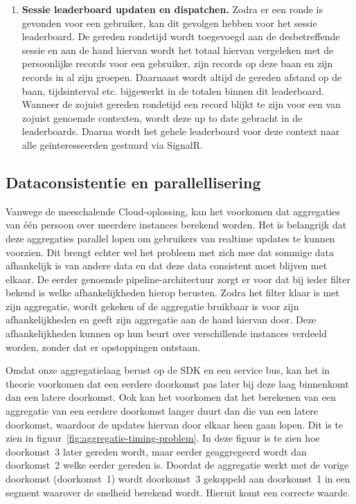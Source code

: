 \begin{enumerate}
\item \textbf{Sessie leaderboard updaten en dispatchen.}
Zodra er een ronde is gevonden voor een gebruiker, kan dit gevolgen hebben voor het sessie leaderboard. De gereden rondetijd wordt toegevoegd aan de desbetreffende sessie en aan de hand hiervan wordt het totaal hiervan vergeleken met de persoonlijke records voor een gebruiker, zijn records op deze baan en zijn records in al zijn groepen. Daarnaast wordt altijd de gereden afstand op de baan, tijdsinterval etc. bijgewerkt in de totalen binnen dit leaderboard. Wanneer de zojuist gereden rondetijd een record blijkt te zijn voor een van zojuist genoemde contexten, wordt deze up to date gebracht in de leaderboards. Daarna wordt het gehele leaderboard voor deze context naar alle geïnteresseerden gestuurd via SignalR.

\end{enumerate}

\subsection{Dataconsistentie en parallellisering}
Vanwege de meeschalende Cloud-oplossing, kan het voorkomen dat aggregaties van één persoon over meerdere instances berekend worden. Het is belangrijk dat deze aggregaties parallel lopen om gebruikers van realtime updates te kunnen voorzien. Dit brengt echter wel het probleem met zich mee dat sommige data afhankelijk is van andere data en dat deze data consistent moet blijven met elkaar. De eerder genoemde pipeline-architectuur zorgt er voor dat bij ieder filter bekend is welke afhankelijkheden hierop berusten. Zodra het filter klaar is met zijn aggregatie, wordt gekeken of de aggregatie bruikbaar is voor zijn afhankelijkheden en geeft zijn aggregatie aan de hand hiervan door. Deze afhankelijkheden kunnen op hun beurt over verschillende instances verdeeld worden, zonder dat er opstoppingen ontstaan.

Omdat onze aggregatielaag berust op de \mylaps SDK en een service bus, kan het in theorie voorkomen dat een eerdere doorkomst pas later bij deze laag binnenkomt dan een latere doorkomst. Ook kan het voorkomen dat het berekenen van een aggregatie van een eerdere doorkomst langer duurt dan die van een latere doorkomst, waardoor de updates hiervan door elkaar heen gaan lopen. Dit is te zien in figuur~\ref{fig:aggregatie-timing-problem}. 
In deze figuur is te zien hoe doorkomst~3 later gereden wordt, maar eerder geaggregeerd wordt dan doorkomst~2 welke eerder gereden is. Doordat de aggregatie werkt met de vorige doorkomst (doorkomst~1) wordt doorkomst~3 gekoppeld aan doorkomst~1 in een segment waarover de snelheid berekend wordt. Hieruit komt een correcte waarde.

